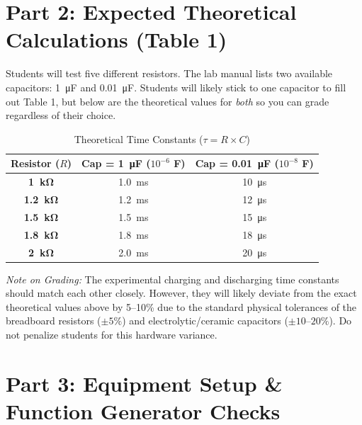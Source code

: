 \documentclass[11pt]{article}
\begin{document}
\vspace{0.2in}
\section*{Part 2: Expected Theoretical Calculations (Table 1)}

Students will test five different resistors. The lab manual lists two available capacitors: \SI{1}{\micro\farad} and \SI{0.01}{\micro\farad}. Students will likely stick to one capacitor to fill out Table 1, but below are the theoretical values for \textit{both} so you can grade regardless of their choice.

\begin{table}[H]
  \centering
  \caption{Theoretical Time Constants ($\tau = R \times C$)}
  \begin{tabular}{ccc}
    \toprule
    \textbf{Resistor ($R$)} & \textbf{Cap = \SI{1}{\micro\farad} ($10^{-6}$ F)} & \textbf{Cap = \SI{0.01}{\micro\farad} ($10^{-8}$ F)} \\
    \midrule
    \textbf{\SI{1}{\kilo\ohm}}   & \SI{1.0}{\milli\second} & \SI{10}{\micro\second} \\
    \textbf{\SI{1.2}{\kilo\ohm}} & \SI{1.2}{\milli\second} & \SI{12}{\micro\second} \\
    \textbf{\SI{1.5}{\kilo\ohm}} & \SI{1.5}{\milli\second} & \SI{15}{\micro\second} \\
    \textbf{\SI{1.8}{\kilo\ohm}} & \SI{1.8}{\milli\second} & \SI{18}{\micro\second} \\
    \textbf{\SI{2}{\kilo\ohm}}   & \SI{2.0}{\milli\second} & \SI{20}{\micro\second} \\
    \bottomrule
  \end{tabular}
\end{table}

\textit{Note on Grading:} The experimental charging and discharging time constants should match each other closely. However, they will likely deviate from the exact theoretical values above by 5--10\% due to the standard physical tolerances of the breadboard resistors ($\pm 5\%$) and electrolytic/ceramic capacitors ($\pm 10$--$20\%$). Do not penalize students for this hardware variance.

\vspace{0.2in}
\section*{Part 3: Equipment Setup \& Function Generator Checks}
\end{document}
